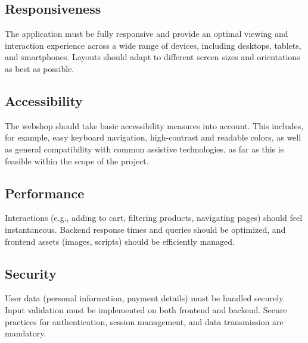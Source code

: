 \documentclass[a4paper,11pt]{article}
\begin{document}
\subsection{Responsiveness}
The application must be fully responsive and provide an optimal viewing and interaction experience across a wide range of devices, including desktops, tablets, and smartphones. Layouts should adapt to different screen sizes and orientations as best as possible.

\subsection{Accessibility}
The webshop should take basic accessibility measures into account. This includes, for example, easy keyboard navigation, high-contrast and readable colors, as well as general compatibility with common assistive technologies, as far as this is feasible within the scope of the project.

\subsection{Performance}
Interactions (e.g., adding to cart, filtering products, navigating pages) should feel instantaneous. Backend response times and queries should be optimized, and frontend assets (images, scripts) should be efficiently managed.

\subsection{Security}
User data (personal information, payment details) must be handled securely. Input validation must be implemented on both frontend and backend. Secure practices for authentication, session management, and data transmission are mandatory.
\end{document}
